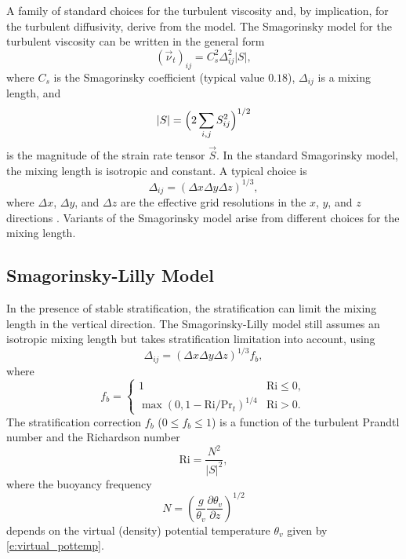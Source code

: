 \documentclass{report}
\begin{document}
A family of standard choices for the turbulent viscosity and, by implication, for the turbulent diffusivity, derive from the \citet{smagorinsky:1963} model. The Smagorinsky model for the turbulent viscosity can be written in the general form 
\begin{equation}
(\vec{\nu}_t)_{ij} = C_{s}^2 \Delta^{2}_{ij} |S|,   
\label{eq:eddy-viscosity_smag}
\end{equation}
where $C_{s} $ is the Smagorinsky coefficient (typical value $0.18$), $\Delta_{ij}$ is a mixing length, and 
\begin{equation}
|S| = \Bigl(2 \sum_{i,j} S_{ij}^2 \Bigr)^{1/2}
\end{equation} 
is the magnitude of the strain rate tensor $\vec{S}$. In the standard Smagorinsky model, the mixing length is isotropic and constant. A typical choice is 
\begin{equation}
    \Delta_{ij} = (\Delta x \Delta y \Delta z)^{1/3},
\end{equation}
where $\Delta x$, $\Delta y$, and $\Delta z$ are the effective grid resolutions in the $x$, $y$, and $z$ directions \citep{deardorff1970}. Variants of the Smagorinsky model arise from different choices for the mixing length.

\subsection{Smagorinsky-Lilly Model}

In the presence of stable stratification, the stratification can limit the mixing length  in the vertical direction. The Smagorinsky-Lilly model \citep{smagorinsky:1963, lilly:1962} still assumes an isotropic mixing length  but takes stratification limitation into account, using 
\begin{equation}\label{eq:smag-lilly}
\Delta_{ij} = (\Delta x \Delta y \Delta z)^{1/3} f_{b},   
\end{equation}
where 
\begin{equation}\label{eq:Lilly_strat}
f_{b} = 
    \begin{cases}
    1 & \mathrm{Ri} \leq 0 ,\\
    \max(0, 1 - \mathrm{Ri} / \mathrm{Pr}_{t})^{1/4} & \mathrm{Ri} > 0 .
    \end{cases}
\end{equation}
The stratification correction $f_{b}$ ($0 \leq f_b \leq 1$) is a function of the turbulent Prandtl number  and the Richardson number 
\[
\mathrm{Ri} =  \frac{N^2}{{|S|}^2},
\]
where the buoyancy frequency
\[
N = \left( \frac{g}{\theta_v} \frac{\partial \theta_v}{\partial z}\right)^{1/2}
\]
depends on the virtual (density) potential temperature $\theta_v$ given by \eqref{e:virtual_pottemp}.
 
\end{document}
